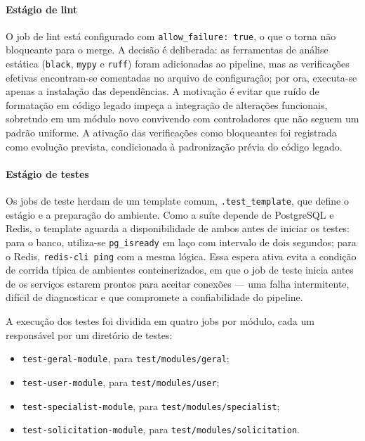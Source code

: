 \paragraph{Estágio de lint}

O job de lint está configurado com \texttt{allow\_failure: true}, o que o torna não
bloqueante para o merge. A decisão é deliberada: as ferramentas de análise estática
(\texttt{black}, \texttt{mypy} e \texttt{ruff}) foram adicionadas ao pipeline, mas as
verificações efetivas encontram-se comentadas no arquivo de configuração; por ora,
executa-se apenas a instalação das dependências. A motivação é evitar que ruído de
formatação em código legado impeça a integração de alterações funcionais, sobretudo em
um módulo novo convivendo com controladores que não seguem um padrão uniforme. A
ativação das verificações como bloqueantes foi registrada como evolução prevista,
condicionada à padronização prévia do código legado.

\paragraph{Estágio de testes}

Os jobs de teste herdam de um template comum, \texttt{.test\_template}, que define o
estágio e a preparação do ambiente. Como a suíte depende de PostgreSQL e Redis, o
template aguarda a disponibilidade de ambos antes de iniciar os testes: para o banco,
utiliza-se \texttt{pg\_isready} em laço com intervalo de dois segundos; para o Redis,
\texttt{redis-cli ping} com a mesma lógica. Essa espera ativa evita a condição de
corrida típica de ambientes conteinerizados, em que o job de teste inicia antes de os
serviços estarem prontos para aceitar conexões — uma falha intermitente, difícil de
diagnosticar e que compromete a confiabilidade do pipeline.

A execução dos testes foi dividida em quatro jobs por módulo, cada um responsável por um
diretório de testes:

\begin{itemize}
\item \texttt{test-geral-module}, para \texttt{test/modules/geral};
\item \texttt{test-user-module}, para \texttt{test/modules/user};
\item \texttt{test-specialist-module}, para \texttt{test/modules/specialist};
\item \texttt{test-solicitation-module}, para \texttt{test/modules/solicitation}.
\end{itemize}

